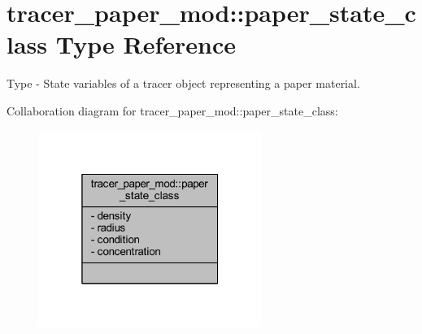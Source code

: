 \hypertarget{structtracer__paper__mod_1_1paper__state__class}{}\section{tracer\+\_\+paper\+\_\+mod\+:\+:paper\+\_\+state\+\_\+class Type Reference}
\label{structtracer__paper__mod_1_1paper__state__class}


Type -\/ State variables of a tracer object representing a paper material.  




Collaboration diagram for tracer\+\_\+paper\+\_\+mod\+:\+:paper\+\_\+state\+\_\+class\+:\nopagebreak
\begin{figure}[H]
\begin{center}
\leavevmode
\includegraphics[width=205pt]{structtracer__paper__mod_1_1paper__state__class__coll__graph}
\end{center}
\end{figure}

